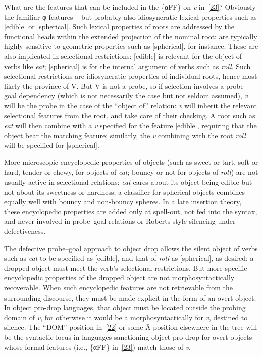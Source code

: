 \documentclass[output=paper]{langsci/langscibook}
\begin{document}
\begin{refcontext}
What are the features that can be included in the \{α{}FF\} on
\emph{v} in~\eqref{23}? Obviously the familiar φ{}-features -- but
probably also idiosyncratic lexical properties such as [edible] or [spherical].
Such lexical properties of roots are addressed by the functional heads within
the extended projection of the nominal root:  are typically highly
sensitive to geometric properties such as [spherical], for instance. These are
also implicated in selectional restrictions: [edible] is relevant for the
object of verbs like \emph{eat}; [spherical] is for the internal argument of
verbs such as \emph{roll}. Such selectional restrictions are idiosyncratic
properties of individual roots, hence most likely the province of V. But V is
not a probe, so if selection involves a probe--goal dependency (which is not
necessarily the case but not seldom assumed), \emph{v} will be the probe in the
case of the \enquote{object of} relation: \emph{v} will inherit the relevant
selectional features from the root, and take care of their checking. A root
such as \emph{eat} will then combine with a \emph{v} specified for the feature
[edible], requiring that the object bear the matching feature; similarly, the
\emph{v} combining with the root \emph{roll} will be specified for [spherical].

More microscopic encyclopedic properties of objects (such as sweet or tart,
soft or hard, tender or chewy, for objects of \emph{eat}; bouncy or not for
objects of \emph{roll}) are not usually active in selectional relations:
\emph{eat} cares about its object being edible but not about its sweetness or
hardness; a classifier for spherical objects combines equally well with bouncy
and non-bouncy spheres. In a late insertion theory, these encyclopedic
properties are added only at spell-out, not fed into the syntax, and never
involved in probe--goal relations or Roberts-style silencing under
defectiveness.

The defective probe--goal approach to object drop allows the silent object of
verbs such as \emph{eat} to be specified as [edible], and that of \emph{roll}
as [spherical], as desired: a dropped object must meet the verb's selectional
restrictions. But more specific encyclopedic properties of the dropped object
are not morphosyntactically recoverable. When such encyclopedic features are
not retrievable from the surrounding discourse, they must be made explicit in
the form of an overt object. In object pro-drop languages, that object must be
located outside the probing domain of \emph{v}, for otherwise it would be a
morphosyntactically  for \emph{v}, destined to silence. The
\enquote{DOM} position in~\eqref{22} or some \=A-position elsewhere in the tree will
be the syntactic locus in languages sanctioning object pro-drop for overt
objects whose formal features (i.e.,  \{α{}FF\} in~\ref{23}) match
those of \emph{v}.


\end{refcontext}
\end{document}
